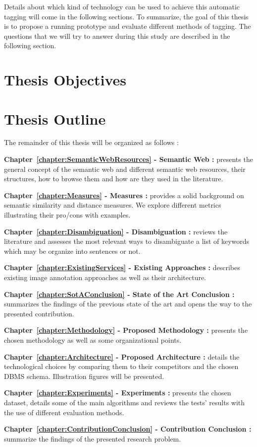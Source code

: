 Details about which kind of technology can be 	used to achieve this automatic tagging will come in the following sections. To summarize, the goal of this thesis is to propose a running prototype and evaluate different methods of tagging. The questions that we will try to answer during this study are described in the following section.


\section{Thesis Objectives} %
\label{sec:thesis_objectives}


\section{Thesis Outline} %
\label{sec:thesis_outline}

The remainder of this thesis will be organized as follows :
\begin{description}
\item\textbf{Chapter~\ref{chapter:SemanticWebResources} - Semantic Web :} presents the general concept of the semantic web and different semantic web resources, their structures, how to browse them and how are they used in the literature. 
\item\textbf{Chapter~\ref{chapter:Measures} - Measures :} provides a solid background on semantic similarity and distance measures. We explore different metrics illustrating their pro/cons with examples.
\item\textbf{Chapter~\ref{chapter:Disambiguation} - Disambiguation :} reviews the literature and assesses the most relevant ways to disambiguate a list of keywords which may be organize into sentences or not. 
\item\textbf{Chapter~\ref{chapter:ExistingServices} - Existing Approaches :} describes existing image annotation approaches as well as their architecture.
\item\textbf{Chapter~\ref{chapter:SotAConclusion} - State of the Art Conclusion :} summarizes the findings of the previous state of the art and opens the way to the presented contribution.
\item\textbf{Chapter~\ref{chapter:Methodology} - Proposed Methodology :} presents the chosen methodology as well as some organizational points.
\item\textbf{Chapter~\ref{chapter:Architecture} - Proposed Architecture :} details the technological choices by comparing them to their competitors and the chosen DBMS schema. Illustration figures will be presented.
\item\textbf{Chapter~\ref{chapter:Experiments} - Experiments :} presents the chosen dataset, details some of the main algorithms and reviews the tests' results with the use of different evaluation methods.
\item\textbf{Chapter~\ref{chapter:ContributionConclusion} - Contribution Conclusion :} summarize the findings of the presented research problem.
\end{description}

